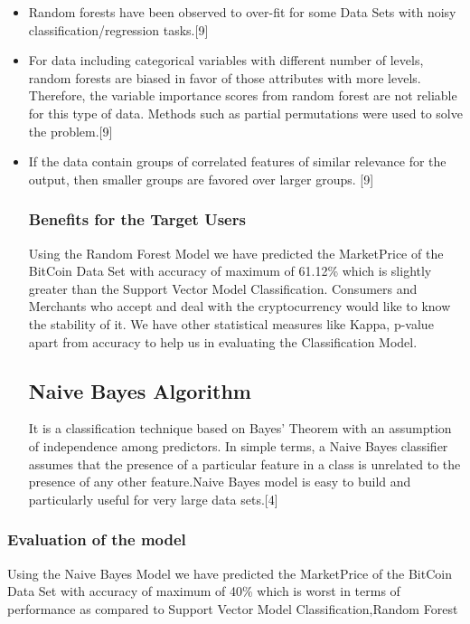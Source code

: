 \documentclass{article}
\begin{document}
\begin{itemize}
\item Random forests have been observed to over-fit for some Data Sets with noisy classification/regression tasks.[9]

\item For data including categorical variables with different number of levels, random forests are biased in favor of those attributes with more levels. Therefore, the variable importance scores from random forest are not reliable for this type of data. Methods such as partial permutations were used to solve the problem.[9]

\item If the data contain groups of correlated features of similar relevance for the output, then smaller groups are favored over larger groups. [9] \newline

\subsubsection {Benefits for the Target Users}
Using the Random Forest Model we have predicted the Market\textunderscore Price of the BitCoin Data Set with accuracy of maximum of 61.12\% which is slightly greater than the Support Vector Model Classification. Consumers and Merchants who accept and deal with the cryptocurrency would like to know the stability of it. We have other statistical measures like Kappa, p-value apart from accuracy to help us in evaluating the Classification Model.

\subsection {Naive Bayes Algorithm}

It is a classification technique based on Bayes’ Theorem with an assumption of independence among predictors. In simple terms, a Naive Bayes classifier assumes that the presence of a particular feature in a class is unrelated to the presence of any other feature.Naive Bayes model is easy to build and particularly useful for very large data sets.[4] 

\end{itemize}
\subsubsection{Evaluation of the model}
Using the  Naive Bayes Model we have predicted the Market\textunderscore Price of the BitCoin Data Set with accuracy of maximum of 40\% which is worst in terms of performance as compared to Support Vector Model Classification,Random Forest\newline
\end{document}
